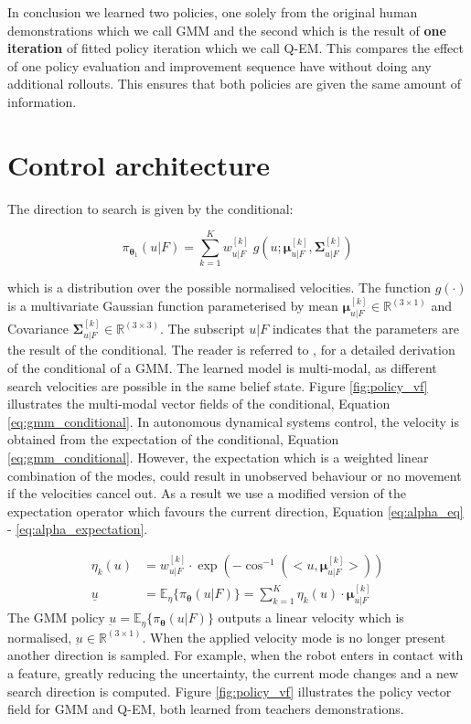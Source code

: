 \documentclass[final,5p,times,twocolumn]{elsarticle}
\newcommand{\SigK}{\boldsymbol{\Sigma}^{[k]}}
\newcommand{\MuK}{\boldsymbol{\mu}^{[k]}}
\newcommand{\xb}{u|F}
\newcommand{\Param}{\boldsymbol{\theta}}
\begin{document}
In conclusion we learned two policies, one solely from the original human demonstrations which we call GMM and the second which 
is the result of \textbf{one iteration} of fitted policy iteration which we call Q-EM. This compares the effect
of one policy evaluation and improvement sequence have without doing any additional rollouts. This ensures that both policies
are given the same amount of information.

\section{Control architecture}\label{sec:control_architecture}

The direction to search is given by the conditional:

\begin{equation}\label{eq:gmm_conditional}
 \pi_{\Param_1}(u\lvert F) = \sum_{k=1}^{K} w^{[k]}_{\xb} \; g(u;\MuK_{\xb},\SigK_{\xb}) 
 \end{equation}

which is a distribution over the possible normalised velocities. The function $g(\cdot)$ is a multivariate
Gaussian function parameterised by mean $\MuK_{\xb} \in \mathbb{R}^{(3\times1)}$ and Covariance $\SigK_{\xb} \in \mathbb{R}^{(3\times3)}$. The subscript $\xb$ indicates that the parameters 
are the result of the conditional. The reader is referred to \cite{gesture_calinon_2010}, \cite{gmr_2004} for 
a detailed derivation of the conditional of a GMM. The learned model 
is multi-modal, as different search velocities are possible 
in the same belief state. Figure \ref{fig:policy_vf} illustrates the multi-modal 
vector fields of the conditional, Equation \ref{eq:gmm_conditional}.
In autonomous dynamical systems control, the velocity is obtained from 
the expectation of the conditional, Equation \ref{eq:gmm_conditional}. However, the expectation which is a weighted 
linear combination of the modes, could result in unobserved behaviour or no movement if the velocities cancel out. 
As a result we use a modified version of the expectation operator which favours the current
direction, Equation \ref{eq:alpha_eq} - \ref{eq:alpha_expectation}.

\begin{align}
 \eta_k(u) &= w^{[k]}_{\xb} \cdot \exp(-\cos^{-1}(<u,\MuK_{\xb}>)) \label{eq:alpha_eq}\\
 \underline{u} &= \mathbb{E}_{\eta}\{\pi_{\Param}(\xb)\} = \sum_{k=1}^K \eta_k(u) \cdot \MuK_{\xb} \label{eq:alpha_expectation}
\end{align}
The GMM policy $\underbar{u} = \mathbb{E}_{\eta}\{\pi_{\Param}(u \lvert F)\}$ outputs a linear velocity which 
is normalised, $\underbar{u} \in \mathbb{R}^{(3 \times 1)}$. When the applied velocity mode is no longer present another direction is sampled. 
For example, when the robot enters in contact with a feature, greatly reducing the uncertainty, the current mode changes and a new search direction is computed. 
Figure \ref{fig:policy_vf} illustrates the policy vector field for GMM and Q-EM, both learned from teachers demonstrations.
\end{document}
